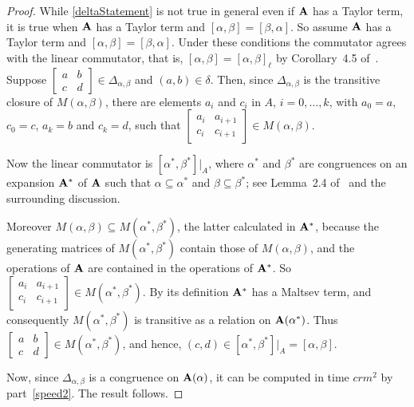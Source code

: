 \begin{proof}
While \eqref{deltaStatement} is not true in general even if
$\mathbf{A}$ has a Taylor term, it is true when
$\mathbf{A}$ has a Taylor term and $[\alpha,\beta] = [\beta,\alpha]$.
So assume $\mathbf{A}$ has a Taylor term and $[\alpha,\beta] = [\beta,\alpha]$.
Under these conditions the commutator agrees with the
linear commutator, that is, $[\alpha,\beta] = [\alpha,\beta]_\ell$ by
Corollary~4.5 of~\cite{MR1663558}.
Suppose
$
\begin{bmatrix}
a&b\\c&d
\end{bmatrix}\in \Delta_{\alpha,\beta}$ and $(a,b)\in \delta$.
Then, since
$\Delta_{\alpha,\beta}$ is the transitive closure of
$M(\alpha,\beta)$, there are
elements $a_i$ and $c_i$ in $A$,
$i = 0, \ldots, k$, with $a_0 =a$,  $c_0 = c$, $a_k = b$ and
$c_k = d$, such that
$
\begin{bmatrix}
a_i&a_{i+1}\\c_i&c_{i+1}
\end{bmatrix}\in M(\alpha,\beta)$.

Now the linear commutator is $[\alpha^*,\beta^*]\big\vert_{A}$,
where $\alpha^*$ and $\beta^*$ are congruences on an expansion
$\mathbf{A}^*$ of $\mathbf{A}$ such that $\alpha \subseteq \alpha^*$
and $\beta \subseteq \beta^*$; see Lemma~2.4 of~\cite{MR1663558}
and the surrounding discussion.

Moreover $M(\alpha,\beta) \subseteq M(\alpha^*,\beta^*)$, the latter
calculated in $\mathbf{A}^*$, because the generating matrices of
$M(\alpha^*,\beta^*)$ contain those of $M(\alpha,\beta)$, and
the operations of $\mathbf{A}$ are contained in the operations
of $\mathbf{A}^*$.  So
$
\begin{bmatrix}
a_i&a_{i+1}\\c_i&c_{i+1}
\end{bmatrix}\in M(\alpha^*,\beta^*)$.
By its definition $\mathbf{A}^*$ has a Maltsev term, and
consequently $M(\alpha^*,\beta^*)$ is transitive as
a relation on $\mathbf{A}(\alpha^*)$. Thus
$
\begin{bmatrix}
a&b\\c&d
\end{bmatrix}\in M(\alpha^*,\beta^*)$, and hence,
$(c,d) \in [\alpha^*,\beta^*]\big\vert_A = [\alpha,\beta]$.

Now, since $\Delta_{\alpha,\beta}$ is a congruence on
$\mathbf{A}(\alpha)$, it can be computed in time
$crm^2$ by part~\eqref{speed2}. The result follows.
\end{proof}



